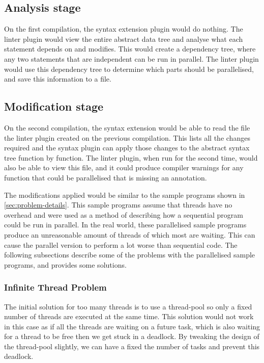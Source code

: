 \documentclass[conference]{IEEEtran}
\begin{document}
\subsection{Analysis stage}
On the first compilation, the syntax extension plugin would do nothing. The linter plugin would view the entire abstract data tree and analyse what each statement depends on and modifies. This would create a dependency tree, where any two statements that are independent can be run in parallel. The linter plugin would use this dependency tree to determine which parts should be parallelised, and save this information to a file.



\subsection{Modification stage}
On the second compilation, the syntax extension would be able to read the file the linter plugin created on the previous compilation. This lists all the changes required and the syntax plugin can apply those changes to the abstract syntax tree function by function. The linter plugin, when run for the second time, would also be able to view this file, and it could produce compiler warnings for any function that could be parallelised that is missing an annotation.

The modifications applied would be similar to the sample programs shown in \autoref{sec:problem-details}. This sample programs assume that threads have no overhead and were used as a method of describing how a sequential program could be run in parallel. In the real world, these parallelised sample programs produce an unreasonable amount of threads of which most are waiting. This can cause the parallel version to perform a lot worse than sequential code. The following subsections describe some of the problems with the parallelised sample programs, and provides some solutions.

\subsubsection{Infinite Thread Problem}
The initial solution for too many threads is to use a thread-pool so only a fixed number of threads are executed at the same time. This solution would not work in this case as if all the threads are waiting on a future task, which is also waiting for a thread to be free then we get stuck in a deadlock. By tweaking the design of the thread-pool slightly, we can have a fixed the number of tasks and prevent this deadlock.
\end{document}
